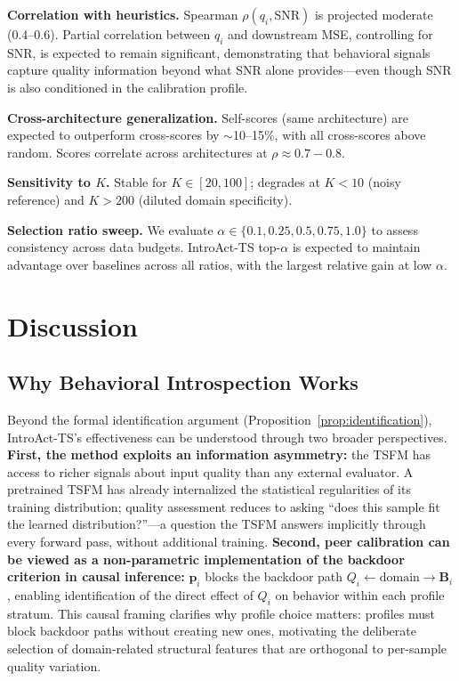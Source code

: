 \documentclass{article}
\begin{document}
\textbf{Correlation with heuristics.} Spearman $\rho(q_i, \text{SNR})$ is projected moderate (0.4--0.6). Partial correlation between $q_i$ and downstream MSE, controlling for SNR, is expected to remain significant, demonstrating that behavioral signals capture quality information beyond what SNR alone provides---even though SNR is also conditioned in the calibration profile.

\textbf{Cross-architecture generalization.} Self-scores (same architecture) are expected to outperform cross-scores by $\sim$10--15\%, with all cross-scores above random. Scores correlate across architectures at $\rho \approx 0.7-0.8$.

\textbf{Sensitivity to $K$.} Stable for $K \in [20, 100]$; degrades at $K < 10$ (noisy reference) and $K > 200$ (diluted domain specificity).

\textbf{Selection ratio sweep.} We evaluate $\alpha \in \{0.1, 0.25, 0.5, 0.75, 1.0\}$ to assess consistency across data budgets. IntroAct-TS top-$\alpha$ is expected to maintain advantage over baselines across all ratios, with the largest relative gain at low $\alpha$.

\section{Discussion}

\subsection{Why Behavioral Introspection Works}

Beyond the formal identification argument (Proposition~\ref{prop:identification}), IntroAct-TS's effectiveness can be understood through two broader perspectives. \textbf{First, the method exploits an information asymmetry:} the TSFM has access to richer signals about input quality than any external evaluator. A pretrained TSFM has already internalized the statistical regularities of its training distribution; quality assessment reduces to asking ``does this sample fit the learned distribution?''---a question the TSFM answers implicitly through every forward pass, without additional training. \textbf{Second, peer calibration can be viewed as a non-parametric implementation of the backdoor criterion in causal inference:} $\mathbf{p}_i$ blocks the backdoor path $Q_i \leftarrow \text{domain} \rightarrow \mathbf{B}_i$, enabling identification of the direct effect of $Q_i$ on behavior within each profile stratum. This causal framing clarifies why profile choice matters: profiles must block backdoor paths without creating new ones, motivating the deliberate selection of domain-related structural features that are orthogonal to per-sample quality variation.
\end{document}
